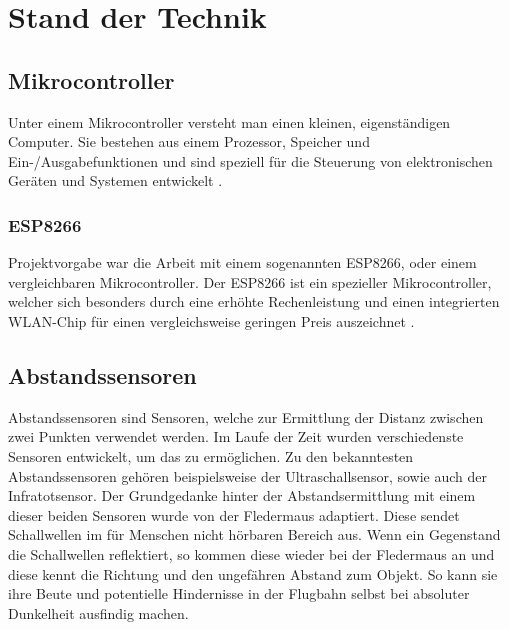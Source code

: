 
\chapter{Stand der Technik}
\section{Mikrocontroller}
\label{sec:Mikrocontroller}
Unter einem Mikrocontroller versteht man einen kleinen, eigenständigen Computer. Sie bestehen aus einem Prozessor, Speicher und Ein-/Ausgabefunktionen und sind speziell für die Steuerung von elektronischen Geräten und Systemen entwickelt \protect{}.

\subsection{ESP8266}
\label{subsec:ESP8266}
Projektvorgabe war die Arbeit mit einem sogenannten ESP8266, oder einem vergleichbaren Mikrocontroller. Der ESP8266 ist ein spezieller Mikrocontroller, welcher sich besonders durch eine erhöhte Rechenleistung und einen integrierten \ac{WLAN}-Chip für einen vergleichsweise geringen Preis auszeichnet \protect{}.

\section{Abstandssensoren}
Abstandssensoren sind Sensoren, welche zur Ermittlung der Distanz zwischen zwei Punkten verwendet werden. Im Laufe der Zeit wurden verschiedenste Sensoren entwickelt, um das zu ermöglichen. Zu den bekanntesten Abstandssensoren gehören beispielsweise der Ultraschallsensor, sowie auch der Infratotsensor.
Der Grundgedanke hinter der Abstandsermittlung mit einem dieser beiden Sensoren wurde von der Fledermaus adaptiert. Diese sendet Schallwellen im für Menschen nicht hörbaren Bereich aus. Wenn ein Gegenstand die Schallwellen reflektiert, so kommen diese wieder bei der Fledermaus an und diese kennt die Richtung und den ungefähren Abstand zum Objekt. So kann sie ihre Beute und potentielle Hindernisse in der Flugbahn selbst bei absoluter Dunkelheit ausfindig machen.

